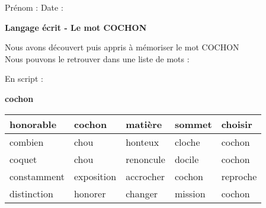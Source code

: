 \documentclass[a4paper, 11pt]{article}
\begin{document}
\sloppy
\pagestyle{empty}
\begin{onehalfspace}

\sffamily 
\noindent \Large Prénom : \fbox{
    \begin{minipage}{9cm}
        \vspace{1.2cm} \hspace{9cm}
    \end{minipage}
} \hspace{1.5cm}\Large Date : \vspace{2mm}\\
\begin{minipage}{12cm}
    \begin{center}
    \Large \bfseries Langage écrit - Le mot \MakeUppercase{
        cochon
    }
    \end{center}
    \normalsize Nous avons découvert puis appris à mémoriser le mot \MakeUppercase{
        cochon
    }\\
    Nous pouvons le retrouver dans une liste de mots :
\end{minipage}

\vspace{0.25cm} 

{\large
\noindent En script :

\begin{center}
    {\huge \bfseries
        cochon
    }
    \vspace{0.25cm}\\
    \begin{tabulary}{17cm}{|h|h|h|h|h|}
    \hline

    honorable & cochon & matière & sommet & choisir\\\hline
combien & chou & honteux & cloche & cochon\\\hline
coquet & chou & renoncule & docile & cochon\\\hline
constamment & exposition & accrocher & cochon & reproche\\\hline
distinction & honorer & changer & mission & cochon\\\hline


    \end{tabulary}
\end{center}
}
\vspace{0.5cm}


\end{onehalfspace}
\end{document}

